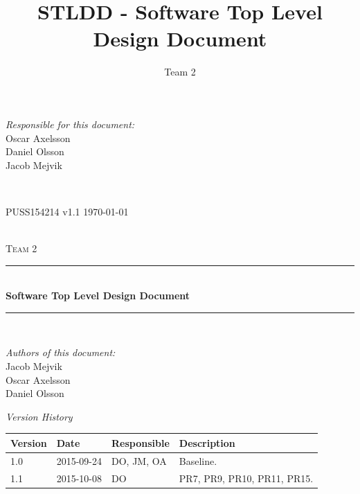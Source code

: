 \documentclass[a4paper]{article}
\title{STLDD - Software Top Level Design Document}
\author{Team 2}
\begin{document}
	\begin{titlepage}
		\newcommand{\HRule}{\rule{\linewidth}{0.5mm}}
		
		\begin{minipage}{0.5\textwidth}
			\begin{flushleft} %
				\textit{Responsible for this document:}\\
				Oscar Axelsson \\
				Daniel Olsson \\
				Jacob Mejvik
			\end{flushleft}
		\end{minipage}
		~
		\begin{minipage}{0.4\textwidth}
			\begin{flushright}
				PUSS154214 v1.1
				\today
			\end{flushright}
		\end{minipage}\\[3cm]
		
		\centering
		\textsc{\LARGE Team 2}\\[0.5cm]
		
		\HRule \\[0.4cm]
		{ \huge \bfseries Software Top Level Design Document}\\[0.4cm] %
		\HRule \\[1.5cm]
		
		\vfill
		\begin{flushleft}
			\textit{Authors of this document:}\\
			Jacob Mejvik \\
			Oscar Axelsson \\
			Daniel Olsson
		\end{flushleft}
		
	\end{titlepage}
	\setcounter{tocdepth}{2}
	
	\begin{center}
		\textit{\large Version History}
		
		\begin{tabular}{ | l | l | l | p{5cm} |}
			\hline
			\textbf{Version} 	& \textbf{Date} 	& \textbf{Responsible} 	& \textbf{Description} 		\\ \hline
			1.0				 	& 2015-09-24 			& DO, JM, OA			&  Baseline. 				\\ \hline
			1.1 			 	& 2015-10-08 			& DO					&  PR7, PR9, PR10, PR11, PR15. \\ \hline			
		\end{tabular}
	\end{center}
	
\end{document}
